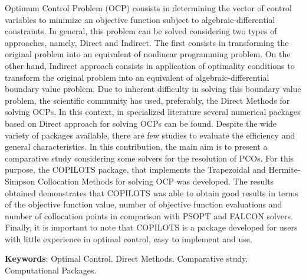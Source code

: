 Optimum Control Problem (OCP) consists in determining the vector of control variables to minimize an objective function subject to algebraic-differential constraints. In general, this problem can be solved considering two types of approaches, namely, Direct and Indirect. The first consists in transforming the original problem into an equivalent of nonlinear programming problem. On the other hand, Indirect approach consists in application of optimality conditions to transform the original problem into an equivalent of algebraic-differential boundary value problem. Due to inherent difficulty in solving this boundary value problem, the scientific community has used, preferably, the Direct Methods for solving OCPs. In this context, in specialized literature several numerical packages based on Direct approach for solving OCPs can be found. Despite the wide variety of packages available, there are few studies to evaluate the efficiency and general characteristics. In this contribution, the main aim is to present a comparative study considering some solvers for the resolution of PCOs. For this purpose, the COPILOTS package, that implements the Trapezoidal and Hermite-Simpson Collocation Methods for solving OCP was developed. The results obtained demonstrates that COPILOTS was able to obtain good results in terms of the objective function value, number of objective function evaluations and number of collocation points in comparison with PSOPT and FALCON solvers. Finally, it is important to note that COPILOTS is a package developed for users with little experience in optimal control, easy to implement and use. 

\noindent \textbf{Keywords}: Optimal Control. Direct Methods. Comparative study. Computational Packages.